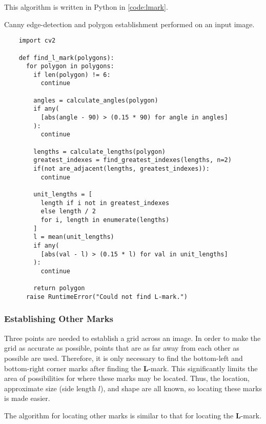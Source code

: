 \documentclass[12pt, letterpaper]{report}
\newcommand*{\itemref}[1]{\hyperref[{#1}]{\autoref*{#1}}}
\begin{document}
This algorithm is written in Python in \itemref{code:lmark}.

\begin{codesample}[!htbp]
  \caption{Canny edge-detection and polygon establishment performed on an input image.}
  \label{code:lmark}
  \begin{verbatim}
    import cv2

    def find_l_mark(polygons):
      for polygon in polygons:
        if len(polygon) != 6:
          continue

        angles = calculate_angles(polygon)
        if any(
          [abs(angle - 90) > (0.15 * 90) for angle in angles]
        ):
          continue

        lengths = calculate_lengths(polygon)
        greatest_indexes = find_greatest_indexes(lengths, n=2)
        if(not are_adjacent(lengths, greatest_indexes)):
          continue

        unit_lengths = [
          length if i not in greatest_indexes
          else length / 2 
          for i, length in enumerate(lengths)
        ]
        l = mean(unit_lengths)
        if any(
          [abs(val - l) > (0.15 * l) for val in unit_lengths]
        ):
          continue
        
        return polygon
      raise RuntimeError("Could not find L-mark.")
  \end{verbatim}
\end{codesample}


\subsubsection{Establishing Other Marks}
Three points are needed to establish a grid across an image.
In order to make the grid as accurate as possible, points that
are as far away from each other as possible are used. Therefore, it is only
necessary to find the bottom-left and bottom-right corner marks after finding
the \textbf{L}-mark. This significantly limits the area of possibilities for where these marks
may be located. Thus, the location, approximate size (side length $l$), and shape
are all known, so locating these marks is made easier.

The algorithm for locating other marks is similar to that for locating the
\textbf{L}-mark.
\end{document}
